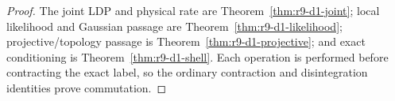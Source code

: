 \begin{proof}
The joint LDP and physical rate are
Theorem~\ref{thm:r9-d1-joint}; local likelihood and Gaussian passage are
Theorem~\ref{thm:r9-d1-likelihood}; projective/topology passage is
Theorem~\ref{thm:r9-d1-projective}; and exact conditioning is
Theorem~\ref{thm:r9-d1-shell}.  Each operation is performed before contracting
the exact label, so the ordinary contraction and disintegration identities
prove commutation.
\end{proof}
